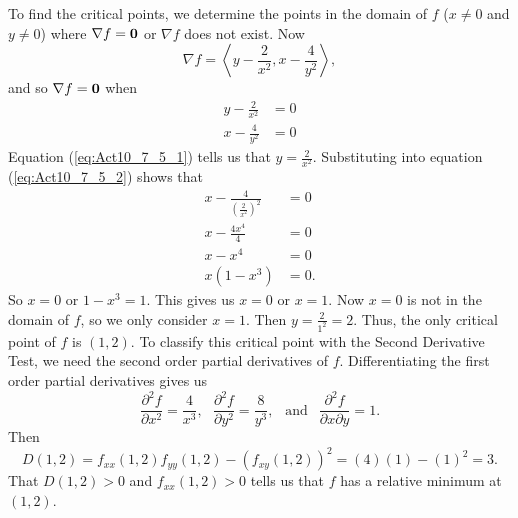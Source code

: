 \begin{activitySolution}
\item To find the critical points, we determine the points in the domain of $f$ ($x \neq 0$ and $y \neq 0$) where $\nabla f = \mathbf{0}$ or $\nabla f$ does not exist. Now
\[\nabla f = \left\langle y-\frac{2}{x^2}, x-\frac{4}{y^2} \right\rangle,\]
and so $\nabla f = \mathbf{0}$ when 
\begin{align}
y-\frac{2}{x^2} &= 0 \label{eq:Act10_7_5_1} \\
x-\frac{4}{y^2} &= 0 \label{eq:Act10_7_5_2}
\end{align}
Equation (\ref{eq:Act10_7_5_1}) tells us that $y = \frac{2}{x^2}$. Substituting into equation (\ref{eq:Act10_7_5_2}) shows that 
\begin{align*}
x - \frac{4}{\left(\frac{2}{x^2}\right)^2} &= 0 \\
x - \frac{4x^4}{4} &= 0 \\
x - x^4 &= 0 \\
x(1-x^3) &= 0.
\end{align*}
So $x = 0$ or $1-x^3 = 1$. This gives us $x=0$ or $x=1$. Now $x=0$ is not in the domain of $f$, so we only consider $x=1$. Then $y = \frac{2}{1^2} = 2$. Thus, the only critical point of $f$ is $(1,2)$. To classify this critical point with the Second Derivative Test, we need the second order partial derivatives of $f$. Differentiating the first order partial derivatives gives us
\[\frac{\partial^2 f}{\partial x^2} = \frac{4}{x^3}, \ \ \ \frac{\partial^2 f}{\partial y^2} = \frac{8}{y^3}, \ \ \text{ and } \ \ \frac{\partial^2 f}{\partial x \partial y} = 1.\]
Then
\[D(1,2) = f_{xx}(1,2)f_{yy}(1,2) - \left(f_{xy}(1,2)\right)^2 = (4)(1) - (1)^2 = 3.\]
That $D(1,2) > 0$ and $f_{xx}(1,2) > 0$ tells us that $f$ has a relative minimum at $(1,2)$. 

\ea
\end{activitySolution}
\aftera

